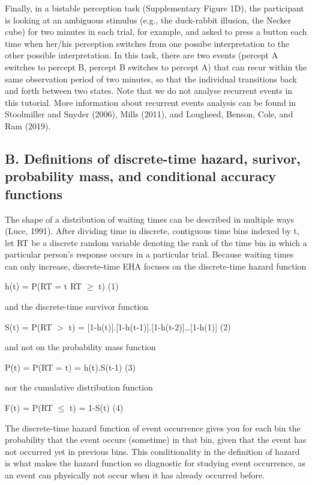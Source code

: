 \documentclass[
  man,floatsintext]{apa6}
\begin{document}
Finally, in a bistable perception task (Supplementary Figure 1D), the participant is looking at an ambiguous stimulus (e.g., the duck-rabbit illusion, the Necker cube) for two minutes in each trial, for example, and asked to press a button each time when her/his perception switches from one possibe interpretation to the other possible interpretation. In this task, there are two events (percept A switches to percept B, percept B switches to percept A) that can recur within the same observation period of two minutes, so that the individual transitions back and forth between two states. Note that we do not analyse recurrent events in this tutorial. More information about recurrent events analysis can be found in Stoolmiller and Snyder (2006), Mills (2011), and Lougheed, Benson, Cole, and Ram (2019).

\subsection{B. Definitions of discrete-time hazard, surivor, probability mass, and conditional accuracy functions}\label{b.-definitions-of-discrete-time-hazard-surivor-probability-mass-and-conditional-accuracy-functions}

The shape of a distribution of waiting times can be described in multiple ways (Luce, 1991). After dividing time in discrete, contiguous time bins indexed by t, let RT be a discrete random variable denoting the rank of the time bin in which a particular person's response occurs in a particular trial.
Because waiting times can only increase, discrete-time EHA focuses on the discrete-time hazard function

\noindent h(t) = P(RT = t\textbar{} RT \(\geq\) t) \hfill  (1)

\noindent and the discrete-time survivor function

\noindent S(t) = P(RT \(>\) t) = {[}1-h(t){]}.{[}1-h(t-1){]}.{[}1-h(t-2){]}\ldots{[}1-h(1){]} \hfill  (2)

\noindent and not on the probability mass function

\noindent P(t) = P(RT = t) = h(t).S(t-1) \hfill  (3)

\noindent nor the cumulative distribution function

\noindent F(t) = P(RT \(\leq\) t) = 1-S(t) \hfill  (4)

The discrete-time hazard function of event occurrence gives you for each bin the probability that the event occurs (sometime) in that bin, given that the event has not occurred yet in previous bins. This conditionality in the definition of hazard is what makes the hazard function so diagnostic for studying event occurrence, as an event can physically not occur when it has already occurred before.
\end{document}
